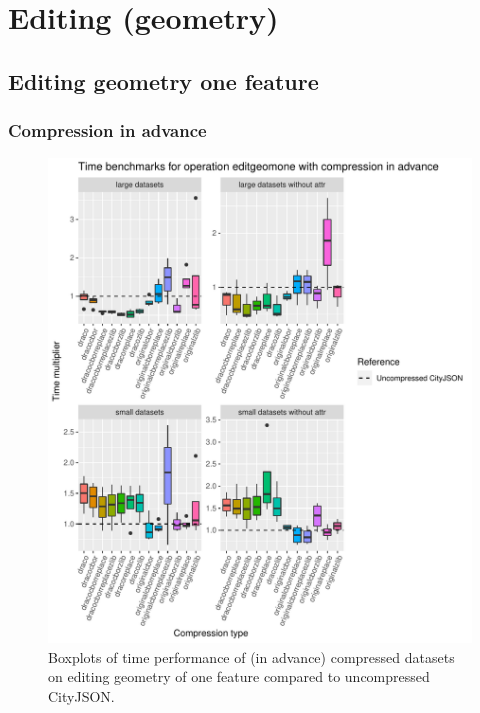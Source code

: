 \clearpage

\section{Editing (geometry)}
\label{bmeditinggeom}

\subsection{Editing geometry one feature}
\label{sec:bmeditone}

\subsubsection{Compression in advance}


\begin{figure}[h!]
    \includegraphics[scale=0.92]{figs/benchmark/individual/editgeomone.pdf}
    \caption{Boxplots of time performance of (in advance) compressed datasets on editing geometry of one feature compared to uncompressed CityJSON.}
    \label{fig:sdvis}
\end{figure}


